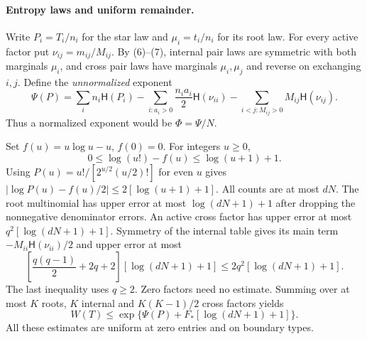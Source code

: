 \documentclass[11pt]{article}
\newcommand{\HH}{\mathsf H}
\begin{document}
\paragraph{Entropy laws and uniform remainder.}
Write $P_i=T_i/n_i$ for the star law and $\mu_i=t_i/n_i$ for its root
law. For every active factor put $\nu_{ij}=m_{ij}/M_{ij}$. By (6)--(7),
internal pair laws are symmetric with both marginals $\mu_i$, and cross
pair laws have marginals $\mu_i,\mu_j$ and reverse on exchanging $i,j$.
Define the \emph{unnormalized} exponent
\[
 \Psi(P)=\sum_i n_i\HH(P_i)
 -\sum_{i:a_i>0}\frac{n_i a_i}{2}\HH(\nu_{ii})
 -\sum_{i<j:M_{ij}>0}M_{ij}\HH(\nu_{ij}).          \tag{9}
\]
Thus a normalized exponent would be $\Phi=\Psi/N$.

Set $f(u)=u\log u-u$, $f(0)=0$. For integers $u\geq0$,
\[
 0\leq\log(u!)-f(u)\leq\log(u+1)+1.
\]
Using $P(u)=u!/[2^{u/2}(u/2)!]$ for even $u$ gives
$|\log P(u)-f(u)/2|\leq2[\log(u+1)+1]$. All counts are at most $dN$.
The root multinomial has upper error at most $\log(dN+1)+1$ after
dropping the nonnegative denominator errors. An active cross factor has
upper error at most $q^2[\log(dN+1)+1]$. Symmetry of the internal table
gives its main term $-M_{ii}\HH(\nu_{ii})/2$ and upper error at most
\[
 \left[\frac{q(q-1)}2+2q+2\right][\log(dN+1)+1]
 \leq2q^2[\log(dN+1)+1].
\]
The last inequality uses $q\geq2$. Zero factors need no estimate. Summing
over at most $K$ roots, $K$ internal and $K(K-1)/2$ cross factors yields
\[
 W(T)\leq\exp\{\Psi(P)+F_*[\log(dN+1)+1]\}.       \tag{10}
\]
All these estimates are uniform at zero entries and on boundary types.
\end{document}
